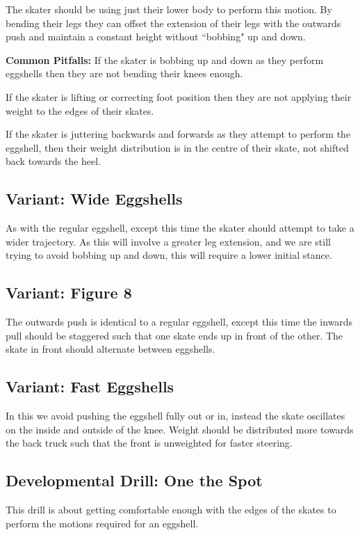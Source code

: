 The skater should be using just their lower body to perform this motion.
By bending their legs they can offset the extension of their legs with the outwards push and maintain a constant height without ``bobbing" up and down. 

{\bf Common Pitfalls: }
If the skater is bobbing up and down as they perform eggshells then they are not bending their knees enough. 

If the skater is lifting or correcting foot position then they are not applying their weight to the edges of their skates.  


If the skater is juttering backwards and forwards as they attempt to perform the eggshell, then their weight distribution is in the centre of their skate, not shifted back towards the heel.   


\subsection*{Variant: Wide Eggshells}
\label{sec:sticky/eggshells/wide}
As with the regular eggshell, except this time the skater should attempt to take a wider trajectory.    
As this will involve a greater leg extension, and we are still trying to avoid bobbing up and down, this will require a lower initial stance.  


\subsection*{Variant: Figure 8}
\label{sec:sticky/eggshells/figure_8}

The outwards push is identical to a regular eggshell, except this time the inwards pull should be staggered such that one skate ends up in front of the other.  
The skate in front should alternate between eggshells. 


\subsection*{Variant: Fast Eggshells}
\label{sec:sticky/eggshells/fast}

In this we avoid pushing the eggshell fully out or in, instead the skate oscillates on the inside and outside of the knee.  
Weight should be distributed more towards the back truck such that the front is unweighted for faster steering.   


\subsection*{Developmental Drill: One the Spot}
This drill is about getting comfortable enough with the edges of the skates to perform the motions required for an eggshell.   

